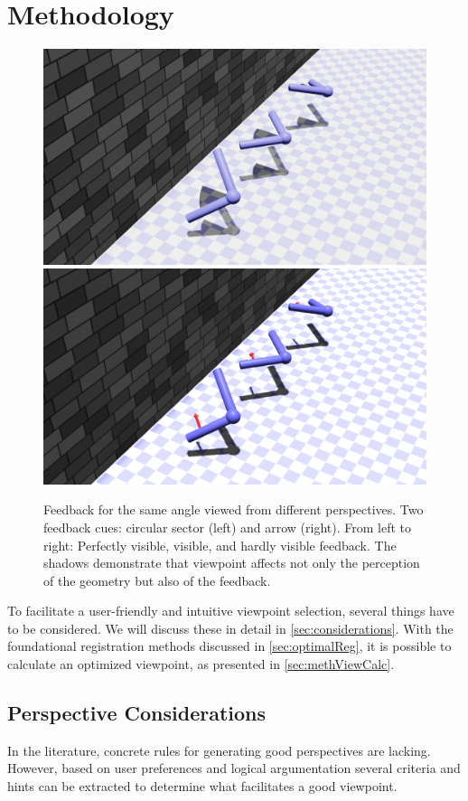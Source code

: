 \section{Methodology \label{sec:view:methodology}}
\begin{figure}[h!]
	\centering
	\includegraphics[width=0.49\linewidth]{pictures/projection_feedback}\hfill
	\includegraphics[width=0.49\linewidth]{pictures/projection_feedback_arrow}
	\caption[Feedback for the same angle viewed from different perspectives.]{Feedback for the same angle viewed from different perspectives. Two feedback cues: circular sector (left) and arrow (right). From left to right: Perfectly visible, visible, and hardly visible feedback. The shadows demonstrate that viewpoint affects not only the perception of the geometry but also of the feedback.}
	\label{fig:projection_feedback}
\end{figure}
To facilitate a user-friendly and intuitive viewpoint selection, several things have to be considered. We will discuss these in detail in \autoref{sec:considerations}. With the foundational registration methods discussed in \autoref{sec:optimalReg}, it is possible to calculate an optimized viewpoint, as presented in \autoref{sec:methViewCalc}.

\subsection*{Perspective Considerations \label{sec:considerations}}
In the literature, concrete rules for generating good perspectives are lacking. However, based on user preferences and logical argumentation several criteria and hints can be extracted to determine what facilitates a good viewpoint.

